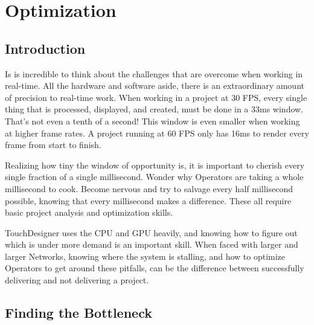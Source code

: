 \cleardoublepage
\chapter{Optimization}
\label{ch:11}


\section{Introduction}

\begin{fullwidth}
Is is incredible to think about the challenges that are overcome when working in real-time. All the hardware and software aside, there is an extraordinary amount of precision to real-time work. When working in a project at 30 FPS, every single thing that is processed, displayed, and created, must be done in a 33ms window. That's not even a tenth of a second! This window is even smaller when working at higher frame rates. A project running at 60 FPS only has 16ms to render every frame from start to finish.

Realizing how tiny the window of opportunity is, it is important to cherish every single fraction of a single millisecond. Wonder why Operators are taking a whole millisecond to cook. Become nervous and try to salvage every half millisecond possible, knowing that every millisecond makes a difference. These all require basic project analysis and optimization skills.

TouchDesigner uses the CPU and GPU heavily, and knowing how to figure out which is under more demand is an important skill. When faced with larger and larger Networks, knowing where the system is stalling, and how to optimize Operators to get around these pitfalls, can be the difference between successfully delivering and not delivering a project.

\end{fullwidth}


\section{Finding the Bottleneck}

